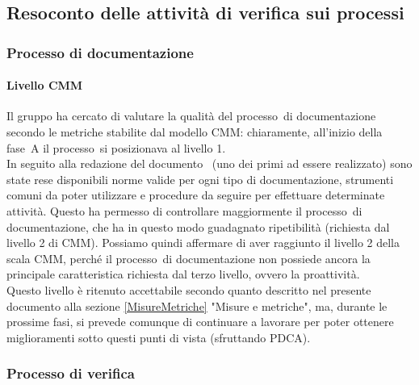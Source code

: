 \documentclass[../PianoDiQualifica.tex]{subfiles}
\begin{document}
\begin{appendices}
	\subsection{Resoconto delle attività di verifica sui processi}
		\subsubsection{Processo di documentazione}
			\paragraph{Livello CMM}
			Il gruppo ha cercato di valutare la qualità del processo\g\ di documentazione secondo le metriche stabilite dal modello CMM\g: chiaramente, all'inizio della fase\g\ A il processo\g\ si posizionava al livello 1.\\
			In seguito alla redazione del documento \normediprogetto\ (uno dei primi ad essere realizzato) sono state rese disponibili norme valide per ogni tipo di documentazione, strumenti comuni da poter utilizzare e procedure da seguire per effettuare determinate attività. Questo ha permesso di controllare maggiormente il processo\g\ di documentazione, che ha in questo modo guadagnato ripetibilità (richiesta dal livello 2 di CMM\g).
			Possiamo quindi affermare di aver raggiunto il livello 2 della scala CMM\g, perché il processo\g\ di documentazione non possiede ancora la principale caratteristica richiesta dal terzo livello, ovvero la proattività.\\
			Questo livello è ritenuto accettabile secondo quanto descritto nel presente documento alla sezione \ref{MisureMetriche} "Misure e metriche", ma, durante le prossime fasi, si prevede comunque di continuare a lavorare per poter ottenere miglioramenti sotto questi punti di vista (sfruttando PDCA\g).
		\subsubsection{Processo di verifica}

\end{appendices}
\end{document}
